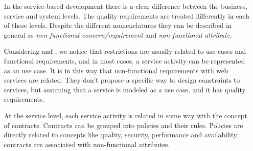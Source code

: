 \documentclass{sig-alternate}
\begin{document}
 
   


In the service-based development there is a clear difference between the
business, service and system levels. The quality requirements are treated
differently in each of these levels. Despite the different nomenclatures they
can be described in general as \textit{non-functional concern/requirement} and
\textit{non-functional attribute}.
  
Considering \cite{ieee_1998} and \cite{sommerville08}, we notice that
restrictions are usually related to use cases and functional requirements, and
in most cases, a service activity can be represented as an use case. It is in
this way that non-functional requirements with web services are related. They
don't propose a specific way to design constraints to services, but assuming
that a service is modeled as a use case, and it has quality requirements.   

At the service level, each service activity is related in some way with the
concept of contracts. Contracts can be grouped into policies and their
rules. Policies are directly related to concepts like quality,
security, performance and availability; contracts are associated with non-functional attributes. 

\bigskip
\end{document}
